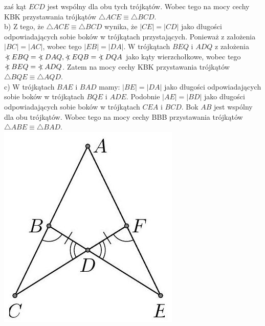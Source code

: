 \documentclass[10pt]{article}
\newcommand\Varangle{\mathop{{<\!\!\!\!\!\text{\small)}}\:}\nolimits}
\begin{document}
zaś kąt \(E C D\) jest wspólny dla obu tych trójkątów. Wobec tego na mocy cechy KBK przystawania trójkątów \(\triangle A C E \equiv \triangle B C D\).\\
b) Z tego, że \(\triangle A C E \equiv \triangle B C D\) wynika, że \(|C E|=|C D|\) jako długości odpowiadających sobie boków w trójkątach przystających. Ponieważ z założenia \(|B C|=|A C|\), wobec tego \(|E B|=|D A|\). W trójkątach \(B E Q\) i \(A D Q\) z założenia \(\Varangle E B Q=\Varangle D A Q, \Varangle E Q B=\Varangle D Q A\) jako kąty wierzchołkowe, wobec tego \(\Varangle B E Q=\Varangle A D Q\). Zatem na mocy cechy KBK przystawania trójkątów \(\triangle B Q E \equiv \triangle A Q D\).\\
c) W trójkątach \(B A E\) i \(B A D\) mamy: \(|B E|=|D A|\) jako długości odpowiadających sobie boków w trójkątach \(B Q E\) i \(A D E\). Podobnie \(|A E|=|B D|\) jako długości odpowiadających sobie boków w trójkątach \(C E A\) i \(B C D\). Bok \(A B\) jest wspólny dla obu trójkątów. Wobec tego na mocy cechy BBB przystawania trójkątów \(\triangle A B E \equiv \triangle B A D\).\\
\includegraphics[max width=\textwidth, center]{2024_11_21_71f62bd117d375398909g-065(2)}\\
\end{document}

